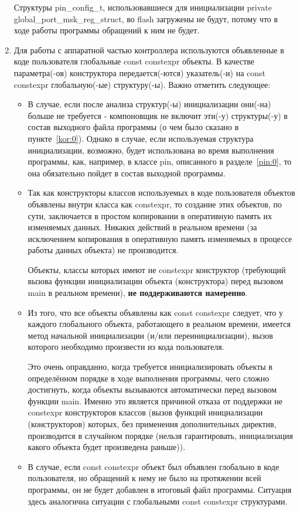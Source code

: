 \begin{enumerate}
	Структуры pin\_\-config\_\-t, использовавшиеся для инициализации private global\_\-port\_\-msk\_\-reg\_\-struct, во flash загружены не будут, потому что в ходе работы программы обращений к ним не будет.
	\label{kor:0}
	\item Для работы с аппаратной частью контроллера используются объявленные в коде пользователя глобальные const constexpr объекты. В качестве параметра(-ов) конструктора передается(-ются) указатель(-и) на const constexpr глобальную(-ые) структуру(-ы). Важно отметить следующее:
	\begin{itemize}
		\item В случае, если после анализа структур(-ы) инициализации они(-на) больше не требуется - компоновщик не включит эти(-у) структуры(-у) в состав выходного файла программы (о чем было сказано в пункте~\ref{kor:0}). Однако в случае, если используемая структура инициализации, возможно, будет использована во время выполнения программы, как, например, в классе pin, описанного в разделе~\ref{pin:0}, то она обязательно пойдет в состав выходной программы.
		\item Так как конструкторы классов используемых в коде пользователя объектов объявлены внутри класса как constexpr, то создание этих объектов, по сути, заключается в простом копировании в оперативную память их изменяемых данных. Никаких действий в реальном времени (за исключением копирования в оперативную память изменяемых в процессе работы данных объекта) не производится.
		
		Объекты, классы которых имеют не constexpr конструктор (требующий вызова функции инициализации  объекта (конструктора) перед вызовом main в реальном времени), \textbf{не поддерживаются намеренно}.
		\item Из того, что все объекты объявлены как const constexpr следует, что у каждого глобального объекта, работающего в реальном времени, имеется метод начальной инициализации (и/или переинициализации), вызов которого необходимо произвести из кода пользователя. 
		
		Это очень оправданно, когда требуется инициализировать объекты в определённом порядке в ходе выполнения программы, чего сложно достигнуть, когда объекты вызываются автоматически перед вызовом функции main. Именно это является причиной отказа от поддержки не constexpr конструкторов классов (вызов функций инициализации (конструкторов) которых, без применения дополнительных директив, производится в случайном порядке (нельзя гарантировать, инициализация какого объекта будет произведена раньше)).
		
		\item В случае, если const constexpr объект был объявлен глобально в коде пользователя, но обращений к нему не было на протяжении всей программы, он не будет добавлен в итоговый файл программы. Ситуация здесь аналогична ситуации с глобальными const constexpr структурами.
	\end{itemize}
\end{enumerate}


\label{gp:0}				%
\label{pin:0}				%
\label{startup:0}			%